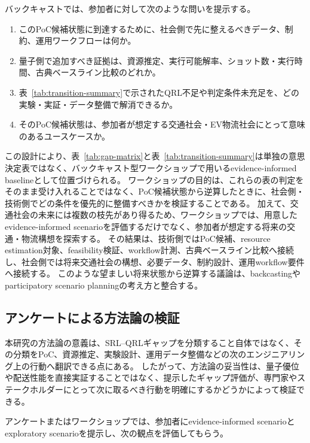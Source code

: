 バックキャストでは、参加者に対して次のような問いを提示する。

\begin{enumerate}
  \item このPoC候補状態に到達するために、社会側で先に整えるべきデータ、制約、運用ワークフローは何か。
  \item 量子側で追加すべき証拠は、資源推定、実行可能解率、ショット数・実行時間、古典ベースライン比較のどれか。
  \item 表~\ref{tab:transition-summary}で示されたQRL不足や判定条件未充足を、どの実験・実証・データ整備で解消できるか。
  \item そのPoC候補状態は、参加者が想定する交通社会・EV物流社会にとって意味のあるユースケースか。
\end{enumerate}

この設計により、表~\ref{tab:gap-matrix}と表~\ref{tab:transition-summary}は単独の意思決定表ではなく、バックキャスト型ワークショップで用いるevidence-informed baselineとして位置づけられる。
ワークショップの目的は、これらの表の判定をそのまま受け入れることではなく、PoC候補状態から逆算したときに、社会側・技術側でどの条件を優先的に整備すべきかを検証することである。
加えて、交通社会の未来には複数の枝先があり得るため、ワークショップでは、用意したevidence-informed scenarioを評価するだけでなく、参加者が想定する将来の交通・物流構想を探索する。
その結果は、技術側ではPoC候補、resource estimation対象、feasibility検証、workflow計測、古典ベースライン比較へ接続し、社会側では将来交通社会の構想、必要データ、制約設計、運用workflow要件へ接続する。
このような望ましい将来状態から逆算する議論は、backcastingやparticipatory scenario planningの考え方と整合する\cite{quist2006backcasting}。

\subsection{アンケートによる方法論の検証}

本研究の方法論の意義は、SRL--QRLギャップを分類すること自体ではなく、その分類をPoC、資源推定、実験設計、運用データ整備などの次のエンジニアリング上の行動へ翻訳できる点にある。
したがって、方法論の妥当性は、量子優位や配送性能を直接実証することではなく、提示したギャップ評価が、専門家やステークホルダーにとって次に取るべき行動を明確にするかどうかによって検証できる。

アンケートまたはワークショップでは、参加者にevidence-informed scenarioとexploratory scenarioを提示し、次の観点を評価してもらう。

